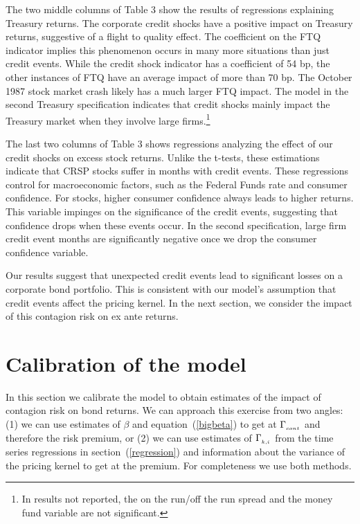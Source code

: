 \documentclass[titlepage,11pt]{article}
\begin{document}
The two middle columns of Table 3 show the results of regressions
explaining Treasury returns.  The corporate credit shocks
have a positive impact on Treasury returns, suggestive of a flight
to quality effect. The coefficient on the FTQ indicator implies
this phenomenon occurs in many more situations than just credit events. While
the credit
shock indicator has a coefficient of 54 bp, the other instances of FTQ
have an average impact of more than 70 bp.  The October 1987 stock market crash
likely has a much larger FTQ impact. The model in the second
Treasury specification indicates that credit shocks mainly impact the
Treasury market when they involve large firms.\footnote{In results not
reported, the on
the run/off the run spread and the money fund variable are not significant.}

The last two columns of Table 3 shows regressions analyzing the
effect of our credit shocks on excess stock returns.  Unlike the t-tests, these
estimations indicate that CRSP stocks suffer in months with credit
events. These regressions control for macroeconomic factors, such as
the Federal Funds rate and consumer confidence.  For stocks, higher consumer
confidence always leads to higher returns. This variable impinges on
the significance of the credit events, suggesting that confidence
drops when these events occur. In the second specification, large firm
credit event months are significantly negative once we drop the
consumer confidence variable.

Our results suggest that unexpected credit events
lead to significant losses on a
corporate bond portfolio.  This is consistent with our model's assumption that
credit events affect the pricing kernel.  In the next section, we consider the
impact of this contagion risk on ex ante returns.

\section{Calibration of the model}

In this section we calibrate the model to obtain estimates of the impact of
contagion risk on bond returns. We can approach this exercise from two angles:
(1) we can use estimates of $\beta$ and equation~(\ref{bigbeta}) to get at
$\Gamma_{_{{cont}}}$ and therefore the risk premium, or (2) we can use estimates
of $\Gamma_{_{{k,i}}}$ from the time series regressions in
section~(\ref{regression}) and information about the variance of the pricing
kernel to get at the premium. For completeness we use both methods.
\end{document}
